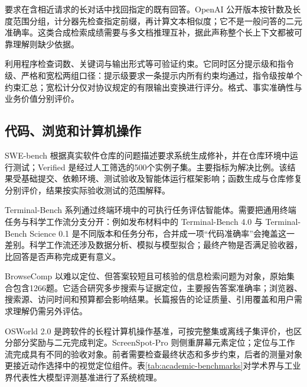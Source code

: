 \documentclass[../textbook.tex]{subfiles}
\begin{document}
要求在含相近请求的长对话中找回指定的既有回答。OpenAI 公开版本按针数及长度范围分组，计分器先检查指定前缀，再计算文本相似度；它不是一般问答的二元准确率\cite{openai2025mrcr}。这类合成检索成绩需要与多文档推理互补，据此声称整个长上下文都被可靠理解则缺少依据。

利用程序检查词数、关键词与输出形式等可验证约束。它同时区分提示级和指令级、严格和宽松两组口径：提示级要求一条提示内所有约束均通过，指令级按单个约束汇总；宽松计分仅对协议规定的有限输出变换进行评分\cite{zhou2023ifeval}。格式、事实准确性与业务价值分别评价。



\subsection{代码、浏览和计算机操作}
SWE-bench 根据真实软件仓库的问题描述要求系统生成修补，并在仓库环境中运行测试；Verified 是经过人工筛选的500个实例子集。主要指标为解决比例。该结果受基础提交、依赖环境、测试验收及智能体运行框架影响；函数生成与仓库修复分别评价，结果按实际验收测试的范围解释\cite{swebench2026verified}。

Terminal-Bench 系列通过终端环境中的可执行任务评估智能体。需要把通用终端任务与科学工作流分支分开：例如发布材料中的 Terminal-Bench 4.0 与 Terminal-Bench Science 0.1 是不同版本和任务分布，合并成一项“代码准确率”会掩盖这一差别。科学工作流还涉及数据分析、模拟与模型拟合；最终产物是否满足验收器，比回答是否声称完成更有意义\cite{openai2026astralaunch}。

BrowseComp 以难以定位、但答案较短且可核验的信息检索问题为对象，原始集合包含1266题。它适合研究多步搜索与证据定位，主要报告答案准确率；浏览器、搜索源、访问时间和预算都会影响结果。长篇报告的论证质量、引用覆盖和用户需求理解仍需另外评估\cite{openai2025browsecomp}。

OSWorld 2.0 是跨软件的长程计算机操作基准，可按完整集或离线子集评价，也区分部分奖励与二元完成判定。ScreenSpot-Pro 则侧重屏幕元素定位；定位与工作流完成具有不同的验收对象。前者需要检查最终状态和多步约束，后者的测量对象更接近动作选择中的视觉定位组件\cite{osworld2026v2,openai2026astralaunch}。表\ref{tab:academic-benchmarks}对学术界与工业界代表性大模型评测基准进行了系统梳理。
\end{document}
